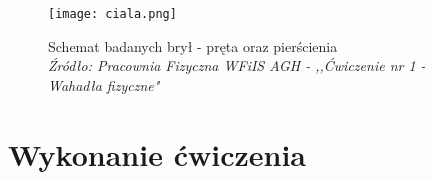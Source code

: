 \documentclass[a4paper,12pts]{article}
\begin{document}
	\begin{figure}[!h]
		\centering
		\texttt{[image: ciala.png]}
		\caption{\centering Schemat badanych brył - pręta oraz pierścienia \\ \textit{Źródło: Pracownia Fizyczna WFiIS AGH - ,,Ćwiczenie nr 1 - Wahadła fizyczne"}}
		\label{ciala}
	\end{figure}


	\section{Wykonanie ćwiczenia}

 
\end{document}
